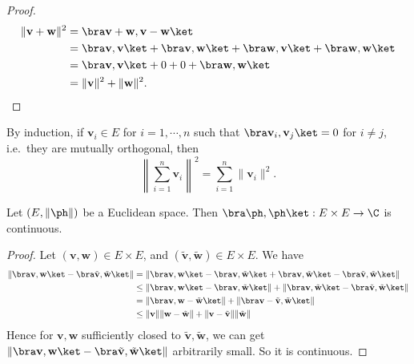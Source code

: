 \documentclass[a4paper]{article}
\begin{document}
\begin{proof}
  \begin{align*}
    \|\mathbf{v} + \mathbf{w}\|^2 &= \bra \mathbf{v} + \mathbf{w}, \mathbf{v} - \mathbf{w}\ket\\
    &= \bra \mathbf{v}, \mathbf{v}\ket + \bra \mathbf{v}, \mathbf{w}\ket + \bra \mathbf{w}, \mathbf{v} \ket + \bra \mathbf{w}, \mathbf{w}\ket\\
    &= \bra \mathbf{v}, \mathbf{v}\ket + 0 + 0 + \bra \mathbf{w}, \mathbf{w}\ket\\
    &= \|\mathbf{v}\|^2 + \|\mathbf{w}\|^2.
  \end{align*}
\end{proof}
By induction, if $\mathbf{v}_i \in E$ for $i = 1,\cdots, n$ such that $\bra \mathbf{v}_i, \mathbf{v}_j\ket = 0$ for $i \not= j$, i.e.\ they are mutually orthogonal, then
\[
  \left\|\sum_{i = 1}^n \mathbf{v}_i\right\|^2 = \sum_{i = 1}^n \|\mathbf{v}_i\|^2.
\]
\begin{prop}
  Let $(E, \|\ph\|)$ be a Euclidean space. Then $\bra \ph, \ph\ket: E \times E \to \C$ is continuous.
\end{prop}

\begin{proof}
  Let $(\mathbf{v}, \mathbf{w}) \in E\times E$, and $(\tilde{\mathbf{v}}, \tilde{\mathbf{w}}) \in E\times E$. We have
  \begin{align*}
    \|\bra \mathbf{v}, \mathbf{w}\ket - \bra \tilde{\mathbf{v}}, \tilde{\mathbf{w}}\ket\| &= \|\bra \mathbf{v}, \mathbf{w}\ket - \bra \mathbf{v}, \tilde{\mathbf{w}}\ket + \bra \mathbf{v}, \tilde{\mathbf{w}}\ket - \bra \tilde{\mathbf{v}}, \tilde{\mathbf{w}}\ket\|\\
    &\leq \|\bra \mathbf{v}, \mathbf{w}\ket - \bra \mathbf{v}, \tilde{\mathbf{w}}\ket\| + \|\bra \mathbf{v}, \tilde{\mathbf{w}}\ket - \bra \tilde{\mathbf{v}}, \tilde{\mathbf{w}}\ket\|\\
    &= \|\bra \mathbf{v}, \mathbf{w} - \tilde{\mathbf{w}}\ket \| + \|\bra \mathbf{v} - \tilde{\mathbf{v}}, \tilde{\mathbf{w}}\ket \|\\
    &\leq \|\mathbf{v}\| \|\mathbf{w} - \tilde{\mathbf{w}}\| + \|\mathbf{v} - \tilde{\mathbf{v}}\|\|\tilde{\mathbf{w}}\|
  \end{align*}
  Hence for $\mathbf{v}, \mathbf{w}$ sufficiently closed to $\tilde{\mathbf{v}}, \tilde{\mathbf{w}}$, we can get $\|\bra \mathbf{v}, \mathbf{w}\ket - \bra \tilde{\mathbf{v}}, \tilde{\mathbf{w}}\ket\|$ arbitrarily small. So it is continuous.
\end{proof}
\end{document}
